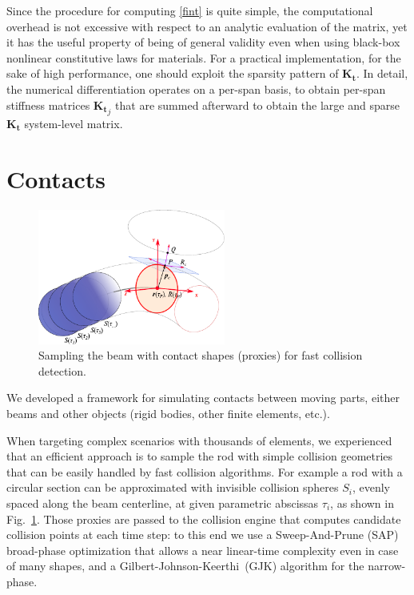 \documentclass[review]{elsarticle}
\def\amatr#1{{\boldsymbol{#1}}}
\begin{document}
Since the procedure for computing \eqref{fint} is quite simple, the computational overhead is not excessive with respect to an analytic evaluation of the matrix, yet it has the useful property of being of general validity even when using black-box nonlinear constitutive laws for materials. For a practical implementation, for the sake of high performance, one should exploit the sparsity pattern of $\amatr{K_t}$. In detail, the numerical differentiation operates on a per-span basis, to obtain per-span stiffness matrices $\amatr{K_t}_{j}$ that are summed afterward to obtain the large and sparse $\amatr{K_t}$ system-level matrix.


\section{Contacts}

\begin{figure}[ht]
\centering
\includegraphics[width=0.55\textwidth]{beam_cosserat_collision.pdf}
\caption{Sampling the beam with contact shapes (proxies) for fast collision detection.}
\label{figcontact}
\end{figure}

We developed a framework for simulating contacts between moving parts, either beams and other objects (rigid bodies, other finite elements, etc.). 

When targeting complex scenarios with thousands of elements, we experienced that an efficient approach is to sample the rod with simple collision geometries that can be easily handled by fast collision algorithms. For example a rod with a circular section can be approximated with invisible collision spheres $S_i$, evenly spaced along the beam centerline, at given parametric abscissas $\tau_i$, as shown in Fig.~\ref{figcontact}. Those proxies are passed to the collision engine that computes candidate collision points at each time step: to this end we use a Sweep-And-Prune (SAP) broad-phase optimization that allows a near linear-time complexity even in case of many shapes, and a Gilbert-Johnson-Keerthi~(GJK) algorithm for the narrow-phase. 
\end{document}
